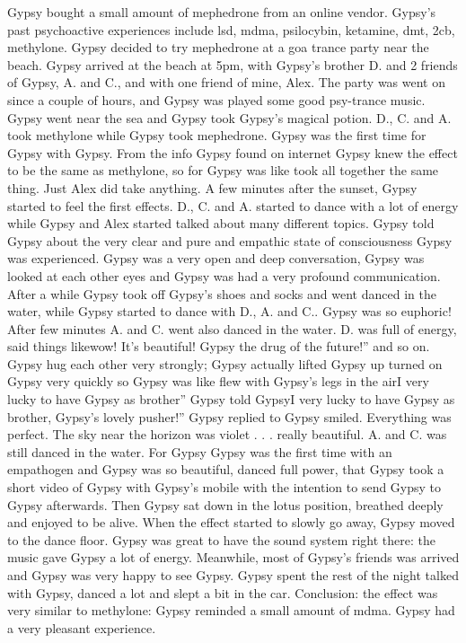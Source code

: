 \documentclass[12pt]{book}
\begin{document}
Gypsy bought a small amount of mephedrone from an online vendor. Gypsy's past psychoactive experiences include lsd, mdma, psilocybin, ketamine, dmt, 2cb, methylone. Gypsy decided to try mephedrone at a goa trance party near the beach. Gypsy arrived at the beach at 5pm, with Gypsy's brother D. and 2 friends of Gypsy, A. and C., and with one friend of mine, Alex. The party was went on since a couple of hours, and Gypsy was played some good psy-trance music. Gypsy went near the sea and Gypsy took Gypsy's magical potion. D., C. and A. took methylone while Gypsy took mephedrone. Gypsy was the first time for Gypsy with Gypsy. From the info Gypsy found on internet Gypsy knew the effect to be the same as methylone, so for Gypsy was like took all together the same thing. Just Alex did take anything. A few minutes after the sunset, Gypsy started to feel the first effects. D., C. and A. started to dance with a lot of energy while Gypsy and Alex started talked about many different topics. Gypsy told Gypsy about the very clear and pure and empathic state of consciousness Gypsy was experienced. Gypsy was a very open and deep conversation, Gypsy was looked at each other eyes and Gypsy was had a very profound communication. After a while Gypsy took off Gypsy's shoes and socks and went danced in the water, while Gypsy started to dance with D., A. and C.. Gypsy was so euphoric! After few minutes A. and C. went also danced in the water. D. was full of energy, said things likewow! It's beautiful! Gypsy the drug of the future!'' and so on. Gypsy hug each other very strongly; Gypsy actually lifted Gypsy up turned on Gypsy very quickly so Gypsy was like flew with Gypsy's legs in the airI very lucky to have Gypsy as brother'' Gypsy told GypsyI very lucky to have Gypsy as brother, Gypsy's lovely pusher!'' Gypsy replied to Gypsy smiled. Everything was perfect. The sky near the horizon was violet . . .  really beautiful. A. and C. was still danced in the water. For Gypsy Gypsy was the first time with an empathogen and Gypsy was so beautiful, danced full power, that Gypsy took a short video of Gypsy with Gypsy's mobile with the intention to send Gypsy to Gypsy afterwards. Then Gypsy sat down in the lotus position, breathed deeply and enjoyed to be alive. When the effect started to slowly go away, Gypsy moved to the dance floor. Gypsy was great to have the sound system right there: the music gave Gypsy a lot of energy. Meanwhile, most of Gypsy's friends was arrived and Gypsy was very happy to see Gypsy. Gypsy spent the rest of the night talked with Gypsy, danced a lot and slept a bit in the car. Conclusion: the effect was very similar to methylone: Gypsy reminded a small amount of mdma. Gypsy had a very pleasant experience.
\end{document}

